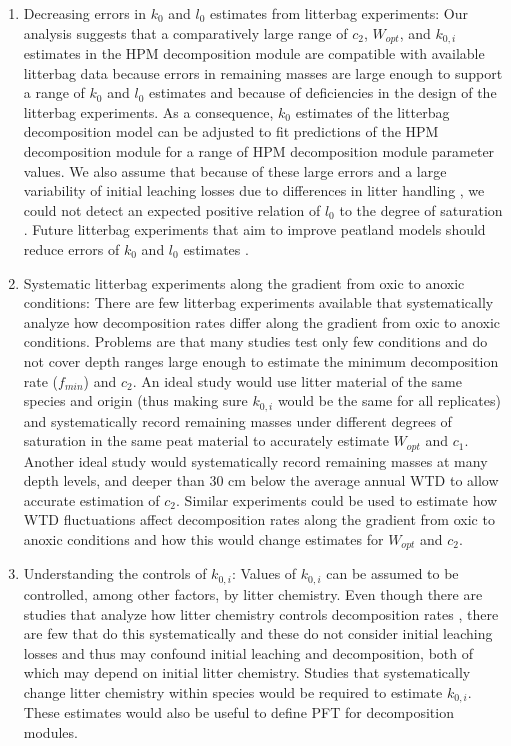 \documentclass[esd, manuscript]{copernicus}
\begin{document}
\begin{enumerate}
\item
  Decreasing errors in \(k_0\) and \(l_0\) estimates from litterbag experiments: Our analysis suggests that a comparatively large range of \(c_2\), \(W_{opt}\), and \(k_{0,i}\) estimates in the HPM decomposition module are compatible with available litterbag data because errors in remaining masses are large enough to support a range of \(k_0\) and \(l_0\) estimates and because of deficiencies in the design of the litterbag experiments. As a consequence, \(k_0\) estimates of the litterbag decomposition model can be adjusted to fit predictions of the HPM decomposition module for a range of HPM decomposition module parameter values. We also assume that because of these large errors and a large variability of initial leaching losses due to differences in litter handling \citep{Teickner.2025}, we could not detect an expected positive relation of \(l_0\) to the degree of saturation \citep{Lind.2022}. Future litterbag experiments that aim to improve peatland models should reduce errors of \(k_0\) and \(l_0\) estimates \citep[e.g.,][]{Teickner.2025}.
\item
  Systematic litterbag experiments along the gradient from oxic to anoxic conditions: There are few litterbag experiments available that systematically analyze how decomposition rates differ along the gradient from oxic to anoxic conditions. Problems are that many studies test only few conditions and do not cover depth ranges large enough to estimate the minimum decomposition rate (\(f_{min}\)) and \(c_2\). An ideal study would use litter material of the same species and origin (thus making sure \(k_{0,i}\) would be the same for all replicates) and systematically record remaining masses under different degrees of saturation in the same peat material to accurately estimate \(W_{opt}\) and \(c_1\). Another ideal study would systematically record remaining masses at many depth levels, and deeper than 30 cm below the average annual WTD to allow accurate estimation of \(c_2\). Similar experiments could be used to estimate how WTD fluctuations affect decomposition rates along the gradient from oxic to anoxic conditions and how this would change estimates for \(W_{opt}\) and \(c_2\).
\item
  Understanding the controls of \(k_{0,i}\): Values of \(k_{0,i}\) can be assumed to be controlled, among other factors, by litter chemistry. Even though there are studies that analyze how litter chemistry controls decomposition rates \citep[e.g.,][]{Turetsky.2008}, there are few that do this systematically \citep[e.g.,][]{Bengtsson.2018} and these do not consider initial leaching losses and thus may confound initial leaching and decomposition, both of which may depend on initial litter chemistry. Studies that systematically change litter chemistry within species would be required to estimate \(k_{0,i}\). These estimates would also be useful to define PFT for decomposition modules.

\end{enumerate}
\end{document}
